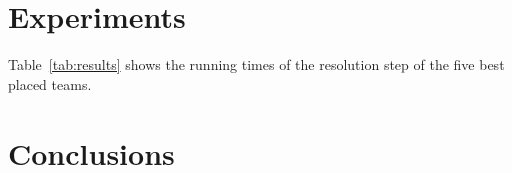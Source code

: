 \documentclass[sigconf]{acmart}
\begin{document}
\section{Experiments}

Table~\ref{tab:results} shows the running times of the resolution step of the five best placed teams.


\begin{table}[htbp]
  \caption{Comparison of the F-measure and the running times of the resolution step of the five best placed teams. The input data for the resolution step consisted of 29{,}787 in JSON formatted e-commerce websites. Measurements were taken on a
laptop running Ubuntu 19.04 with 16 GB of RAM and two Intel Core i5-4310U CPUs. The underlying SSD was a 500\,GB 860 EVO mSATA. We cleared the page cache, dentries, and inodes before each run to avoid reading the input data from RAM instead of the SSD.}
  \label{tab:results}
\end{table}


\section{Conclusions}




\end{document}
